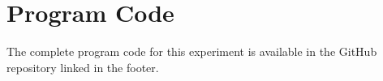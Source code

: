 \documentclass[12pt,a4paper]{report}
\begin{document}



\section{Program Code}
The complete program code for this experiment is available in the GitHub repository linked in the footer.





























\end{document}
